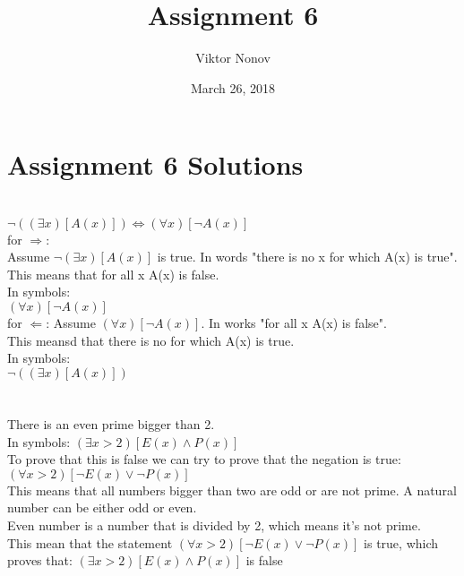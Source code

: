 \documentclass{article}
\title{Assignment 6}
\author{Viktor Nonov}
\date{March 26, 2018}
\begin{document}
\section*{Assignment 6 Solutions}

\section{}
$\neg((\exists x)[A(x)]) \Leftrightarrow (\forall x)[\neg A(x)]$ \\
for $\Rightarrow$:\\
Assume $\neg(\exists x)[A(x)]$ is true. In words "there is no x for which A(x) is true".\\
This means that for all x A(x) is false. \\
In symbols:\\
$(\forall x)[\neg A(x)]$ \\
for $\Leftarrow$:
Assume $(\forall x)[\neg A(x)]$. In works "for all x A(x) is false".\\
This meansd that there is no for which A(x) is true.\\
In symbols: \\
$\neg((\exists x)[A(x)])$

\section{}
There is an even prime bigger than 2.\\
In symbols: $(\exists x > 2)[E(x) \wedge P(x)]$\\
To prove that this is false we can try to prove that the negation is true:\\
$(\forall x > 2)[\neg E(x) \vee \neg P(x)]$\\
This means that all numbers bigger than two are odd or are not prime. A natural number can be either odd or even. \\
Even number is a number that is divided by 2, which means it's not prime. \\
This mean that the statement $(\forall x > 2)[\neg E(x) \vee \neg P(x)]$ is true, which proves that: $(\exists x > 2)[E(x) \wedge P(x)]$ is false
\end{document}
